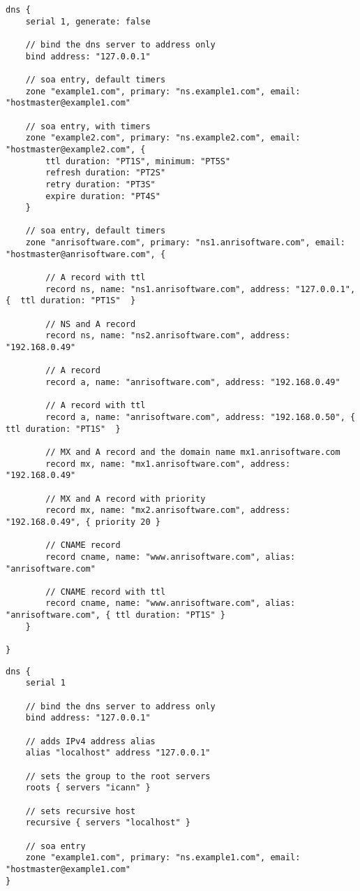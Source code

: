 \begin{lstlisting}[style=Java,label=lst:dns_example_script,
title={Dns example script.}]
dns {
    serial 1, generate: false

    // bind the dns server to address only
    bind address: "127.0.0.1"

    // soa entry, default timers
    zone "example1.com", primary: "ns.example1.com", email: "hostmaster@example1.com"

    // soa entry, with timers
    zone "example2.com", primary: "ns.example2.com", email: "hostmaster@example2.com", {
        ttl duration: "PT1S", minimum: "PT5S"
        refresh duration: "PT2S"
        retry duration: "PT3S"
        expire duration: "PT4S"
    }

    // soa entry, default timers
    zone "anrisoftware.com", primary: "ns1.anrisoftware.com", email: "hostmaster@anrisoftware.com", {

        // A record with ttl
        record ns, name: "ns1.anrisoftware.com", address: "127.0.0.1", {  ttl duration: "PT1S"  }

        // NS and A record
        record ns, name: "ns2.anrisoftware.com", address: "192.168.0.49"

        // A record
        record a, name: "anrisoftware.com", address: "192.168.0.49"

        // A record with ttl
        record a, name: "anrisoftware.com", address: "192.168.0.50", { ttl duration: "PT1S"  }

        // MX and A record and the domain name mx1.anrisoftware.com
        record mx, name: "mx1.anrisoftware.com", address: "192.168.0.49"

        // MX and A record with priority
        record mx, name: "mx2.anrisoftware.com", address: "192.168.0.49", { priority 20 }

        // CNAME record
        record cname, name: "www.anrisoftware.com", alias: "anrisoftware.com"

        // CNAME record with ttl
        record cname, name: "www.anrisoftware.com", alias: "anrisoftware.com", { ttl duration: "PT1S" }
    }

}
\end{lstlisting}

\begin{lstlisting}[style=Java,label=lst:dns_example_recursive_script,
title={Dns service with recursive look-up.}]
dns {
    serial 1

    // bind the dns server to address only
    bind address: "127.0.0.1"

    // adds IPv4 address alias
    alias "localhost" address "127.0.0.1"

    // sets the group to the root servers
    roots { servers "icann" }

    // sets recursive host
    recursive { servers "localhost" }

    // soa entry
    zone "example1.com", primary: "ns.example1.com", email: "hostmaster@example1.com"
}
\end{lstlisting}

